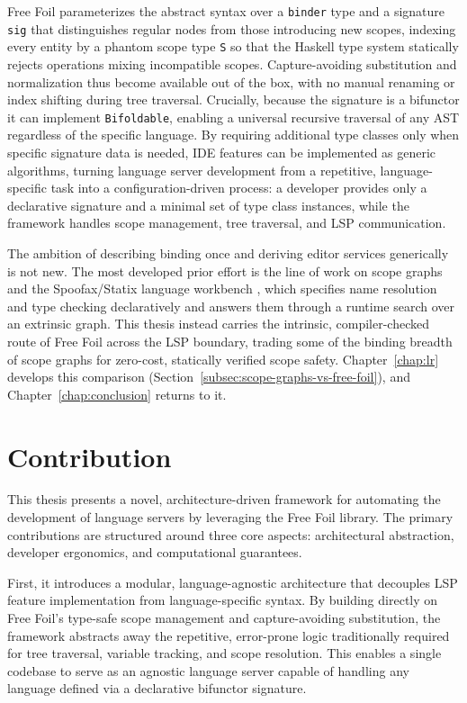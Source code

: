 Free Foil parameterizes the abstract syntax over a \texttt{binder} type and a signature \texttt{sig} that distinguishes regular nodes from those introducing new scopes, indexing every entity by a phantom scope type \texttt{S} so that the Haskell type system statically rejects operations mixing incompatible scopes. 
Capture-avoiding substitution and normalization thus become available out of the box, with no manual renaming or index shifting during tree traversal. 
Crucially, because the signature is a bifunctor it can implement \texttt{Bifoldable}, enabling a universal recursive traversal of any AST regardless of the specific language. 
By requiring additional type classes only when specific signature data is needed, IDE features can be implemented as generic algorithms, turning language server development from a repetitive, language-specific task into a configuration-driven process: a developer provides only a declarative signature and a minimal set of type class instances, while the framework handles scope management, tree traversal, and LSP communication.

The ambition of describing binding once and deriving editor services generically is not new. 
The most developed prior effort is the line of work on scope graphs and the Spoofax/Statix language workbench \cite{scopeGraphs2015,scopesAsTypes2018,spoofax2010}, which specifies name resolution and type checking declaratively and answers them through a runtime search over an extrinsic graph. 
This thesis instead carries the intrinsic, compiler-checked route of Free Foil across the LSP boundary, trading some of the binding breadth of scope graphs for zero-cost, statically verified scope safety. 
Chapter~\ref{chap:lr} develops this comparison (Section~\ref{subsec:scope-graphs-vs-free-foil}), and Chapter~\ref{chap:conclusion} returns to it.

\section{Contribution}
\label{sec:contribution}

This thesis presents a novel, architecture-driven framework for automating the development of language servers by leveraging the Free Foil library. 
The primary contributions are structured around three core aspects: architectural abstraction, developer ergonomics, and computational guarantees.

First, it introduces a modular, language-agnostic architecture that decouples LSP feature implementation from language-specific syntax. 
By building directly on Free Foil's type-safe scope management and capture-avoiding substitution, the framework abstracts away the repetitive, error-prone logic traditionally required for tree traversal, variable tracking, and scope resolution. 
This enables a single codebase to serve as an agnostic language server capable of handling any language defined via a declarative bifunctor signature.


